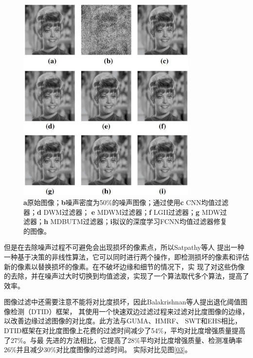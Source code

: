 \begin{figure}[htbp]
	\begin{center}
	    \vspace{10pt} %
		\includegraphics[width = 0.8\textwidth]{images/07.eps}
		\caption{\textbf{a}原始图像；\textbf{b}噪声密度为50\%的噪声图像；通过使用\textbf{c} CNN均值过滤器；\textbf{d} DWM过滤器；
		\textbf{e} MDWM过滤器；\textbf{f} LGII过滤器；\textbf{g} MDW过滤器；\textbf{h} MDBUTM过滤器；\textbf{i}拟议的深度学习FCNN均值过滤器修复的图像。} 
		\label{07} %
	\end{center}
\end{figure}


但是在去除噪声过程不可避免会出现损坏的像素点，所以Satpathy等人\cite{satpathyAdaptiveNonlinearFiltering2022}
提出一种一种基于决策的非线性算法，它可以同时进行两个操作，即检测损坏的像素和评估新的像素以替换损坏的像素。在不破坏边缘和细节的情况下，实
现了对这些伪像的去除，并在噪声过大时切换到均值滤波，实现了一个算法取代多个算法，提高了效率。

图像过滤中还需要注意不能将对比度损坏，因此Balakrishnan等人\cite{natarajanContrastEnhancementBased2022}提出退化阈值图像检测（DTID）框架，
其使用一个快速双边过滤过程来过滤对比度图像的边缘，以改善边缘过滤图像的对比度。此方法与GUMA、HMRF、
SWT和EHS相比，DTID框架在对比度图像上花费的过滤时间减少了54\%，平均对比度增强质量提高了27\%。与最
先进的方法相比，它提高了28\%平均对比度增强质量、检测准确率26\%并且减少30\%对比度图像的过滤时间。
实际对比见图\ref{03}。

